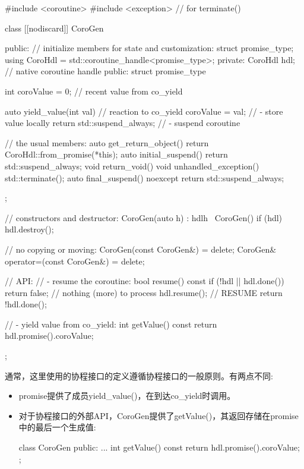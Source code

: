 \begin{cpp}
#include <coroutine>
#include <exception> // for terminate()

class [[nodiscard]] CoroGen {
public:
	// initialize members for state and customization:
	struct promise_type;
	using CoroHdl = std::coroutine_handle<promise_type>;
private:
	CoroHdl hdl; // native coroutine handle
public:
	struct promise_type {
		int coroValue = 0; // recent value from co_yield
		
		auto yield_value(int val) { // reaction to co_yield
			coroValue = val; // - store value locally
			return std::suspend_always{}; // - suspend coroutine
		}
		
		// the usual members:
		auto get_return_object() { return CoroHdl::from_promise(*this); }
		auto initial_suspend() { return std::suspend_always{}; }
		void return_void() { }
		void unhandled_exception() { std::terminate(); }
		auto final_suspend() noexcept { return std::suspend_always{}; }
	};
	
	// constructors and destructor:
	CoroGen(auto h) : hdl{h} { }
	~CoroGen() { if (hdl) hdl.destroy(); }
	
	// no copying or moving:
	CoroGen(const CoroGen&) = delete;
	CoroGen& operator=(const CoroGen&) = delete;
	
	// API:
	// - resume the coroutine:
	bool resume() const {
		if (!hdl || hdl.done()) {
			return false; // nothing (more) to process
			}
			hdl.resume(); // RESUME
			return !hdl.done();
		}
		
	// - yield value from co_yield:
	int getValue() const {
		return hdl.promise().coroValue;
	}
};
\end{cpp}

通常，这里使用的协程接口的定义遵循协程接口的一般原则。有两点不同:

\begin{itemize}
\item 
promise提供了成员yield\_value()，在到达co\_yield时调用。

\item
对于协程接口的外部API，CoroGen提供了getValue()，其返回存储在promise中的最后一个生成值:

\begin{cpp}
class CoroGen {
	public:
	...
	int getValue() const {
		return hdl.promise().coroValue;
	}
};
\end{cpp}
\end{itemize}


